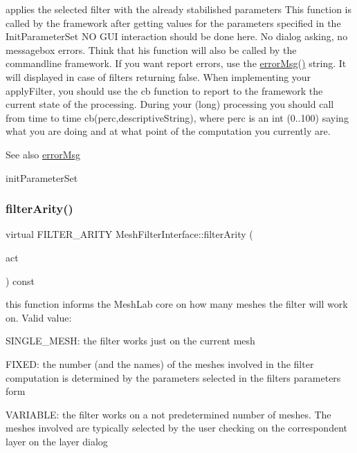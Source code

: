 applies the selected filter with the already stabilished parameters This function is called by the framework after getting values for the parameters specified in the Init\+Parameter\+Set NO G\+UI interaction should be done here. No dialog asking, no messagebox errors. Think that his function will also be called by the commandline framework. If you want report errors, use the \hyperlink{class_mesh_filter_interface_aedd8f6d4430e3327cbddee552d4fbe4f}{error\+Msg()} string. It will displayed in case of filters returning false. When implementing your apply\+Filter, you should use the cb function to report to the framework the current state of the processing. During your (long) processing you should call from time to time cb(perc,descriptive\+String), where perc is an int (0..100) saying what you are doing and at what point of the computation you currently are. 

\begin{DoxySeeAlso}{See also}
\hyperlink{class_mesh_filter_interface_aedd8f6d4430e3327cbddee552d4fbe4f}{error\+Msg} 

init\+Parameter\+Set 
\end{DoxySeeAlso}
\mbox{\label{class_mesh_filter_interface_af948d1ad148015df1e32d347fd7ca802}} 
\subsubsection{\texorpdfstring{filter\+Arity()}{filterArity()}}
{\footnotesize\ttfamily virtual F\+I\+L\+T\+E\+R\+\_\+\+A\+R\+I\+TY Mesh\+Filter\+Interface\+::filter\+Arity (\begin{DoxyParamCaption}\item[{Q\+Action $\ast$}]{act }\end{DoxyParamCaption}) const\hspace{0.3cm}{\ttfamily [pure virtual]}}



this function informs the Mesh\+Lab core on how many meshes the filter will work on. Valid value\+: 


\begin{DoxyItemize}
\item S\+I\+N\+G\+L\+E\+\_\+\+M\+E\+SH\+: the filter works just on the current mesh
\item F\+I\+X\+ED\+: the number (and the names) of the meshes involved in the filter computation is determined by the parameters selected in the filter\textquotesingle{}s parameters form
\item V\+A\+R\+I\+A\+B\+LE\+: the filter works on a not predetermined number of meshes. The meshes involved are typically selected by the user checking on the correspondent layer on the layer dialog 
\end{DoxyItemize}\mbox{\label{class_mesh_filter_interface_aa75cbc99d9d0b411676b1ae3aa693568}} 
